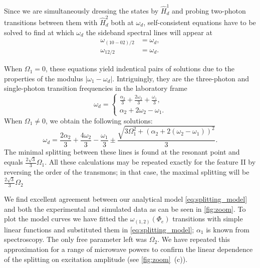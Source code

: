 \documentclass[%
 pra,
 amsmath,amssymb,
 reprint,%
]{revtex4-1}
\begin{document}
Since we are simultaneously dressing the states by $\hat H_d^1$ and probing two-photon transitions between them with $\hat H_d^2$ both at $\omega_d$, self-consistent equations have to be solved to find at which $\omega_d$ the sideband spectral lines will appear at
\begin{equation}
\begin{aligned}
\omega_{(10-02)/2} &= \omega_d,\\
\omega_{12/2} &= \omega_d.
\end{aligned}
\label{eq:two-photon}
\end{equation}

When $\Omega_1 = 0$, these equations yield indentical pairs of solutions due to the properties of the modulus $|\omega_1 - \omega_d|$. Intriguingly, they are the three-photon and single-photon transition frequencies in the laboratory frame
\begin{equation}
\omega_d = \begin{cases} \frac{\alpha_2}{3} + \frac{2 \omega_{2}}{3} + \frac{\omega_{1}}{3}, \\ \alpha_2 + 2 \omega_{2} - \omega_{1}.\end{cases}
\end{equation}
When $\Omega_1 \neq 0$, we obtain the following solutions:
\begin{equation}
\omega_d = \frac{2 \alpha_2}{3} + \frac{4 \omega_{2}}{3} - \frac{\omega_{1}}{3} \pm \frac{\sqrt{3 \Omega_{1}^{2} + \left( \alpha_2 + 2 (\omega_{2} - \omega_{1})\right)^{2}}}{3}.
\label{eq:splitting_model}
\end{equation}
The minimal splitting between these lines is found at the resonant point and equals $\frac{2 \sqrt{3}}{{3}} \Omega_1$. All these calculations may be repeated exactly for the feature II by reversing the order of the transmons; in that case, the maximal splitting will be $\frac{2 \sqrt{3}}{{3}} \Omega_2$

We find excellent agreement between our analytical model \eqref{eq:splitting_model} and both the experimental and simulated data as can be seen in \autoref{fig:zoom}. To plot the model curves we have fitted the $\omega_{(1,2)}(\Phi_e)$ transitions with simple linear functions and substituted them in \eqref{eq:splitting_model}; $\alpha_1$ is known from spectroscopy. The only free parameter left was $\Omega_2$. We have repeated this approximation for a range of microwave powers to confirm the linear dependence of the splitting on excitation amplitude (see \autoref{fig:zoom}~(c)).
\end{document}
